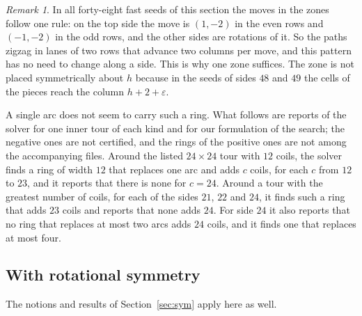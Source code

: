 \documentclass[11pt]{amsart}
\theoremstyle{remark}
\newtheorem{remark}[theorem]{Remark}
\begin{document}
\begin{remark}\label{rem:fast}
In all forty-eight fast seeds of this section the moves in the zones follow one rule: on the top side the move is $(1,-2)$ in the
even rows and $(-1,-2)$ in the odd rows, and the other sides are rotations of it. So the paths zigzag in lanes of
two rows that advance two columns per move, and this pattern has no need to change along a side. This is why one
zone suffices. The zone is not placed symmetrically about $h$ because in the seeds of sides $48$ and $49$ the
cells of the pieces reach the column $h+2+\varepsilon$.

A single arc does not seem to carry such a ring. What follows are reports of the solver for one inner tour of each
kind and for our formulation of the search; the negative ones are not certified, and the rings of the positive ones
are not among the accompanying files. Around the listed $24\times24$ tour with $12$ coils, the solver finds a ring
of width $12$ that replaces one arc and adds $c$ coils, for each $c$ from $12$ to $23$, and it reports that there is
none for $c=24$. Around a tour with the greatest number of coils, for each of the sides $21$, $22$ and $24$, it
finds such a ring that adds $23$ coils and reports that none adds $24$. For side $24$ it also reports that no ring
that replaces at most two arcs adds $24$ coils, and it finds one that replaces at most four.
\end{remark}

\subsection*{With rotational symmetry}
The notions and results of Section~\ref{sec:sym} apply here as well.
\end{document}
